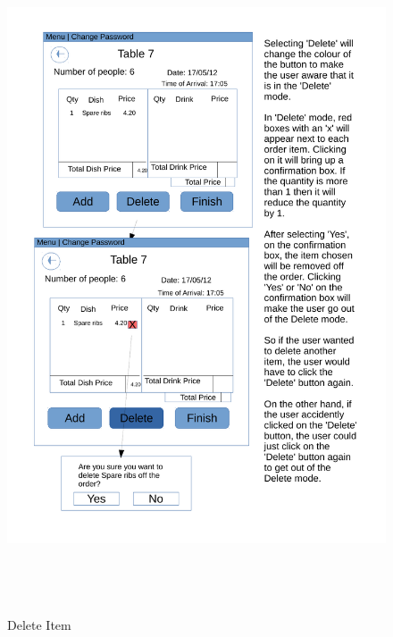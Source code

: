 \begin{figure}[H]
    \includegraphics[height = 20cm]{./Design/Images/Interface4}
    \caption{Delete Item} \label{fig:Delete}
\end{figure}

